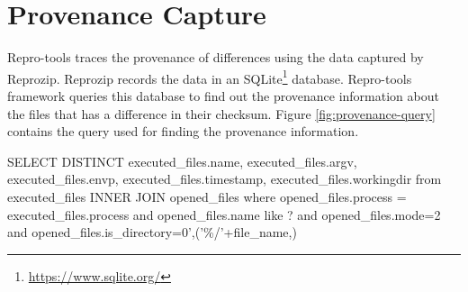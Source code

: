 

\section{Provenance Capture}
Repro-tools traces the provenance of differences using the data captured by Reprozip. Reprozip records the data in an SQLite\footnote{\url{https://www.sqlite.org/}} database. Repro-tools framework queries this database to find out the provenance information about the files that has a difference in their checksum. Figure \ref{fig:provenance-query} contains the query used for finding the provenance information.\\

\begin{tcolorbox}[colback=black!5!white,colframe=black!75!black]
SELECT DISTINCT executed\_files.name, executed\_files.argv, executed\_files.envp, executed\_files.timestamp, executed\_files.workingdir from executed\_files INNER JOIN opened\_files where opened\_files.process = executed\_files.process and opened\_files.name like ? and opened\_files.mode=2 and opened\_files.is\_directory=0',('\%/'+file\_name,)
\end{tcolorbox}
\label{fig:provenance-query}

